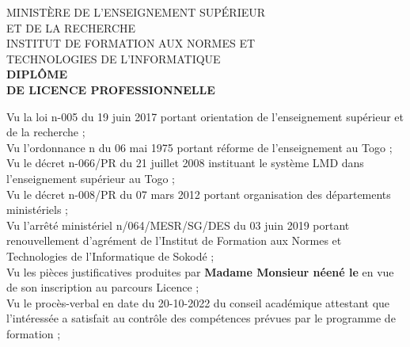 \documentclass[a4paper, landscape, 10pt]{article}
\date{}
\title{}
\newcommand\BackgroundPic{
\put(-4,0){
\parbox[b][\paperheight]{\paperwidth}{
\texttt{[image: fond\_diplome\_haut]}
}}}
\begin{document}
\AddToShipoutPicture*{\BackgroundPic}
\maketitle
\vspace{-4.5cm}

\begin{center}
\large
MINISTÈRE DE L'ENSEIGNEMENT SUPÉRIEUR\\
ET DE LA RECHERCHE\\
\vspace{0.5cm}
INSTITUT DE FORMATION AUX NORMES ET\\
TECHNOLOGIES DE L'INFORMATIQUE\\
\vspace{0.5cm}
\LARGE
\textbf{DIPLÔME\\
DE LICENCE PROFESSIONNELLE}\\
\end{center}
\vspace{0.5cm}
\noindent
Vu la loi n-005 du 19 juin 2017 portant orientation de l’enseignement supérieur et de la recherche ;\\
Vu l’ordonnance n du 06 mai 1975 portant réforme de l’enseignement au Togo ;\\
Vu le décret n-066/PR du 21 juillet 2008 instituant le système LMD dans l’enseignement supérieur au Togo ;\\
Vu le décret n-008/PR du 07 mars 2012 portant organisation des départements ministériels ;\\
Vu l'arrêté ministériel n/064/MESR/SG/DES du 03 juin 2019 portant renouvellement d'agrément de l'Institut de Formation aux Normes et Technologies de l’Informatique de Sokodé ;\\
Vu les pièces justificatives produites par \textbf{Madame Monsieur \textbf{} \textbf{} néené le } en vue de son inscription au parcours Licence ;\\
Vu le procès-verbal en date du 20-10-2022 \hspace{0.15cm}du conseil académique attestant que l'intéressée a satisfait au contrôle des compétences prévues par le programme de formation ;\\
\end{document}

